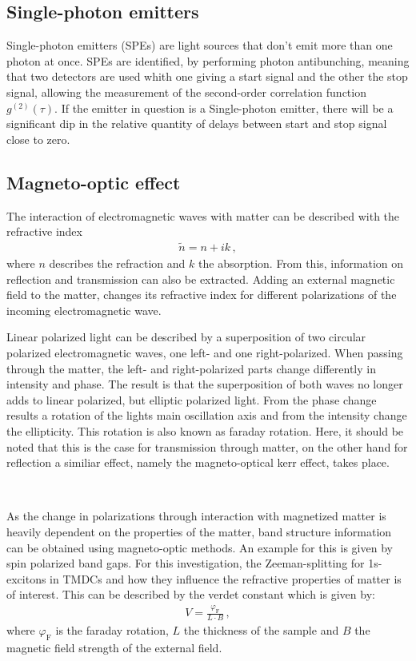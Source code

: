 \subsection{Single-photon emitters}
\label{sec:theory:spe}

Single-photon emitters (SPEs) are light sources that don't emit more than one photon at once.
SPEs are identified, by performing photon antibunching, meaning that two detectors are used whith one giving a start signal and the other the stop signal, allowing the measurement of the second-order correlation function $g^{(2)}(\tau)$.
If the emitter in question is a Single-photon emitter, there will be a significant dip in the relative quantity of delays between start and stop signal close to zero.

\subsection{Magneto-optic effect}

	The interaction of electromagnetic waves with matter can be described with the refractive index
	\begin{align*}
		\tilde{n} = n + ik \,,
	\end{align*}
	where $n$ describes the refraction and $k$ the absorption.
	From this, information on reflection and transmission can also be extracted.
	Adding an external magnetic field to the matter, changes its refractive index for different polarizations of the incoming electromagnetic wave.

  Linear polarized light can be described by a superposition of two circular polarized electromagnetic waves, one left- and one right-polarized.
	When passing through the matter, the left- and right-polarized parts change differently in intensity and phase.
	The result is that the superposition of both waves no longer adds to linear polarized, but elliptic polarized light.
	From the phase change results a rotation of the lights main oscillation axis and from the intensity change the ellipticity.
	This rotation is also known as faraday rotation.
	Here, it should be noted that this is the case for transmission through matter, on the other hand for reflection a similiar effect, namely the magneto-optical kerr effect, takes place.

	\

	As the change in polarizations through interaction with magnetized matter is heavily dependent on the properties of the matter, band structure information can be obtained using magneto-optic methods.
	An example for this is given by spin polarized band gaps.
	For this investigation, the Zeeman-splitting for 1s-excitons in TMDCs and how they influence the refractive properties of matter is of interest.
	This can be described by the verdet constant which is given by:
	\begin{align*}
		V = \frac{\varphi_\text{F}}{L\cdot B} \,,
	\end{align*}
	where $\varphi_\text{F}$ is the faraday rotation, $L$ the thickness of the sample and $B$ the magnetic field strength of the external field.


